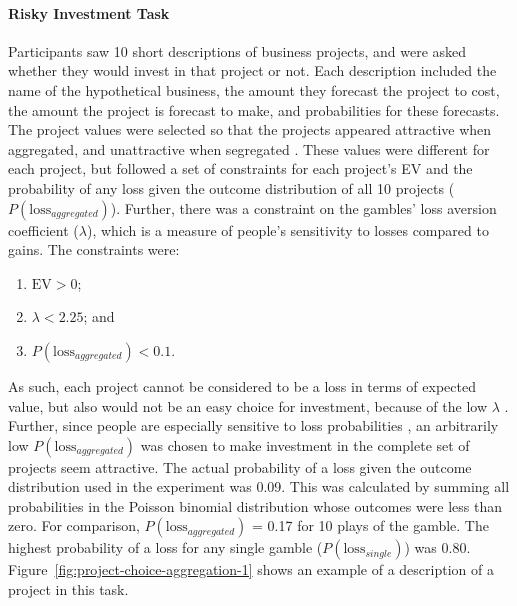 \documentclass[a4paper, nobind]{templates/ociamthesis}
\theoremstyle{definition}
\theoremstyle{definition}
\theoremstyle{definition}
\theoremstyle{definition}
\theoremstyle{remark}
\begin{document}
\hypertarget{task-aggregation-1}{%
\paragraph{Risky Investment Task}\label{task-aggregation-1}}

Participants saw 10 short descriptions of business projects, and were asked
whether they would invest in that project or not. Each description included the
name of the hypothetical business, the amount they forecast the project to cost,
the amount the project is forecast to make, and probabilities for these
forecasts. The project values were selected so that the projects appeared
attractive when aggregated, and unattractive when segregated \autocite[see][]{langer2001}.
These values were different for each project, but followed a set of constraints
for each project's EV and the probability of any loss given the outcome
distribution of all 10 projects (\(P(\text{loss}_{aggregated})\)). Further, there
was a constraint on the gambles' loss aversion coefficient (\(\lambda\)), which is
a measure of people's sensitivity to losses compared to gains. The constraints
were:

\begin{enumerate}
\def\labelenumi{\arabic{enumi}.}
\item
  \(\text{EV} > 0\);
\item
  \(\lambda < 2.25\); and
\item
  \(P(\text{loss}_{aggregated}) < 0.1\).
\end{enumerate}

As such, each project cannot be considered to be a loss in terms of expected
value, but also would not be an easy choice for investment, because of the low
\(\lambda\) \autocite[made to be lower than the median loss aversion coefficient calculated
in][]{tversky1992}. Further, since people are especially sensitive to loss
probabilities \autocite{zeisberger2020,kahneman1979}, an arbitrarily low
\(P(\text{loss}_{aggregated})\) was chosen to make investment in the complete set
of projects seem attractive. The actual probability of a loss given the outcome
distribution used in the experiment was 0.09.
This was calculated by summing all probabilities in the Poisson binomial
distribution whose outcomes were less than zero. For comparison,
\(P(\text{loss}_{aggregated})\) = 0.17
for 10 plays of the \textcite{samuelson1963} gamble. The highest probability of a loss for
any single gamble (\(P(\text{loss}_{single})\)) was
0.80.
Figure~\ref{fig:project-choice-aggregation-1} shows an example of a description
of a project in this task.
\end{document}
